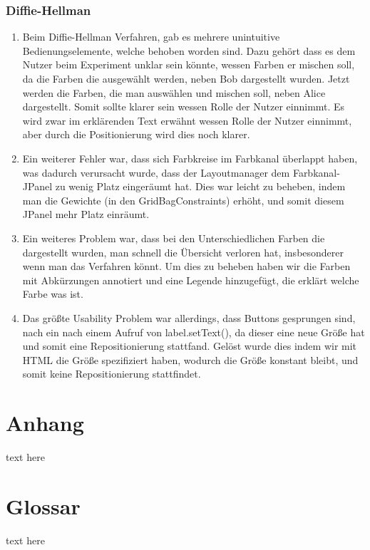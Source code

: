 \documentclass{article}
\begin{document}
     \subsubsection{Diffie-Hellman}
     \begin{enumerate}
         \item Beim Diffie-Hellman Verfahren, gab es mehrere unintuitive Bedienungselemente, welche behoben worden sind.
             Dazu gehört dass es dem Nutzer beim Experiment unklar sein könnte, wessen Farben er mischen soll,
             da die Farben die ausgewählt werden, neben Bob dargestellt wurden. Jetzt werden die Farben,
             die man auswählen und mischen soll, neben Alice dargestellt. Somit sollte klarer sein wessen Rolle
             der Nutzer einnimmt.
             Es wird zwar im erklärenden Text erwähnt wessen Rolle der Nutzer einnimmt, aber durch die Positionierung
             wird dies noch klarer.
         \item Ein weiterer Fehler war, dass sich Farbkreise im Farbkanal überlappt haben,
             was dadurch verursacht wurde, dass der Layoutmanager dem Farbkanal-JPanel zu wenig Platz eingeräumt hat.
             Dies war leicht zu beheben, indem man die Gewichte (in den GridBagConstraints) erhöht,
             und somit diesem JPanel mehr Platz einräumt.
         \item Ein weiteres Problem war, dass bei den Unterschiedlichen Farben die dargestellt wurden,
             man schnell die Übersicht verloren hat, insbesonderer wenn man das Verfahren könnt.
             Um dies zu beheben haben wir die Farben mit Abkürzungen annotiert und eine Legende hinzugefügt,
             die erklärt welche Farbe was ist.
         \item Das größte Usability Problem war allerdings, dass Buttons gesprungen sind, nach ein nach einem Aufruf
             von label.setText(), da dieser eine neue Größe hat und somit eine Repositionierung stattfand.
             Gelöst wurde dies indem wir mit HTML die Größe spezifiziert haben, wodurch die Größe konstant bleibt,
             und somit keine Repositionierung stattfindet.
     \end{enumerate}


\section{Anhang}
text here

\section{Glossar}
text here

 \restoregeometry

\glsaddall
\printglossary[numberedsection, style=altlist]
\end{document}
